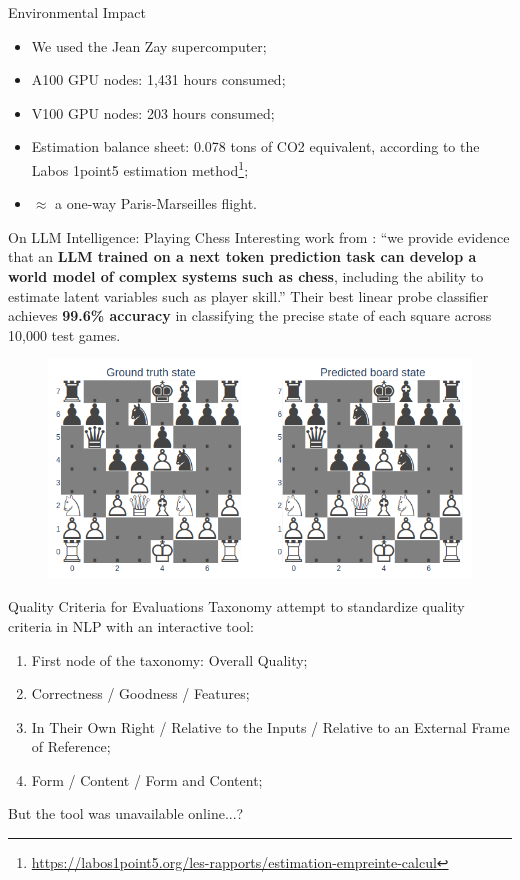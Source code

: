 \begin{frame}{Environmental Impact}
    \begin{itemize}
        \item We used the Jean Zay supercomputer;
        \item A100 GPU nodes: 1,431 hours consumed;
        \item V100 GPU nodes: 203 hours consumed;
        \item Estimation balance sheet: 0.078 tons of CO2 equivalent, according to the Labos 1point5 estimation method\footnote{\scriptsize \url{https://labos1point5.org/les-rapports/estimation-empreinte-calcul}};
        \item $\approx$ a one-way Paris-Marseilles flight.
    \end{itemize}
\end{frame}

\begin{frame}{On LLM Intelligence: Playing Chess}
    Interesting work from \citet{karvonen2024emergent}: ``we provide evidence that an \textbf{LLM trained on a next token prediction task can develop a world model of complex systems such as chess}, including the ability to estimate latent variables such as player skill.'' Their best linear probe classifier achieves \textbf{99.6\% accuracy} in classifying the precise state of each square across 10,000 test games.
    \begin{figure}
        \centering
        \includegraphics[width=0.8\linewidth]{pictures/board_state.png}
        \label{fig:chess_board_states}
    \end{figure}
\end{frame}

\begin{frame}{Quality Criteria for Evaluations Taxonomy}
    \citet{belz-etal-2024-qcet-interactive} attempt to standardize quality criteria in NLP with an interactive tool:
    \begin{enumerate}
        \item First node of the taxonomy: Overall Quality;\
        \item Correctness / Goodness / Features;
        \item In Their Own Right / Relative to the Inputs / Relative to an External Frame of Reference;
        \item Form / Content / Form and Content;
    \end{enumerate}
    But the tool was unavailable online...?
\end{frame}


